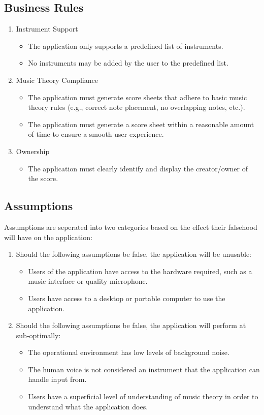 \documentclass[12pt]{article}
\begin{document}
\subsection{Business Rules}
\begin{enumerate}
  \item Instrument Support
  \begin{itemize}
    \item The application only supports a predefined list of instruments.
    \item No instruments may be added by the user to the predefined list.
  \end{itemize}
  \item Music Theory Compliance
  \begin{itemize}
    \item The application must generate score sheets that adhere to basic music 
    theory rules (e.g., correct note placement, no overlapping notes, etc.).
    \item The application must generate a score sheet within a reasonable amount of time
    to ensure a smooth user experience. 
  \end{itemize}
  \item Ownership
  \begin{itemize}
    \item The application must clearly identify and display the creator/owner of the score.
  \end{itemize}
\end{enumerate}
\subsection{Assumptions}
Assumptions are seperated into two categories based on the effect their falsehood will have 
on the application:
\begin{enumerate}
  \item Should the following assumptions be false, the application will be unusable:
  \begin{itemize}
    \item Users of the application have access to the hardware required, such as a music 
    interface or quality microphone.
    \item Users have access to a desktop or portable computer to use the application.
  \end{itemize}
  \item Should the following assumptions be false, the application will perform at sub-optimally: 
  \begin{itemize}
    \item The operational environment has low levels of background noise.
    \item The human voice is not considered an instrument that the application can handle input from.
    \item Users have a superficial level of understanding of music theory in order to understand 
    what the application does.
  \end{itemize}
\end{enumerate}
\end{document}
